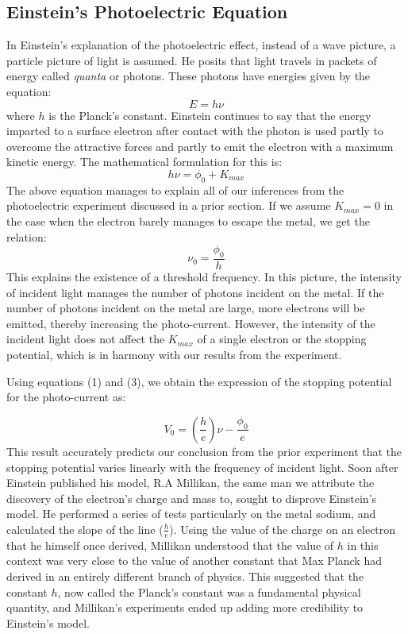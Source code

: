 \documentclass{article}
\begin{document}
\subsection{Einstein's Photoelectric Equation}
In Einstein's explanation of the photoelectric effect, instead of a wave picture, a particle picture of light is assumed. He posits that light travels in packets of energy called \emph{quanta} or photons. These photons have energies given by the equation:
\begin{equation}
    E = h \nu 
\end{equation}
where $h$ is the Planck's constant. Einstein continues to say that the energy imparted to a surface electron after contact with the photon is used partly to overcome the attractive forces and partly to emit the electron with a maximum kinetic energy. The mathematical formulation for this is: 
\begin{equation}
    h \nu = \phi_{0} + K_{max}
\end{equation}
The above equation manages to explain all of our inferences from the photoelectric experiment discussed in a prior section. If we assume $K_{max} = 0$ in the case when the electron barely manages to escape the metal, we get the relation:
\begin{equation}
    \nu_{0} = \frac{\phi_{0}}{h}
\end{equation}
This explains the existence of a threshold frequency. In this picture, the intensity of incident light manages the number of photons incident on the metal. If the number of photons incident on the metal are large, more electrons will be emitted, thereby increasing the photo-current. However, the intensity of the incident light does not affect the $K_{max}$ of a single electron or the stopping potential, which is in harmony with our results from the experiment. 

\newpage 

Using equations (1) and (3), we obtain the expression of the stopping potential for the photo-current as:

\begin{equation}
    V_{0} = (\frac{h}{e}) \nu - \frac{\phi_{0}}{e}
\end{equation}
This result accurately predicts our conclusion from the prior experiment that the stopping potential varies linearly with the frequency of incident light. Soon after Einstein published his model, R.A Millikan, the same man we attribute the discovery of the electron's charge and mass to, sought to disprove Einstein's model.  He performed a series of tests particularly on the metal sodium, and calculated the slope of the line ($\frac{h}{e}$). Using the value of the charge on an electron that he himself once derived, Millikan understood that the value of $h$ in this context was very close to the value of another constant that Max Planck had derived in an entirely different branch of physics. This suggested that the constant $h$, now called the Planck's constant was a fundamental physical quantity, and Millikan's experiments ended up adding more credibility to Einstein's model. 
\end{document}
